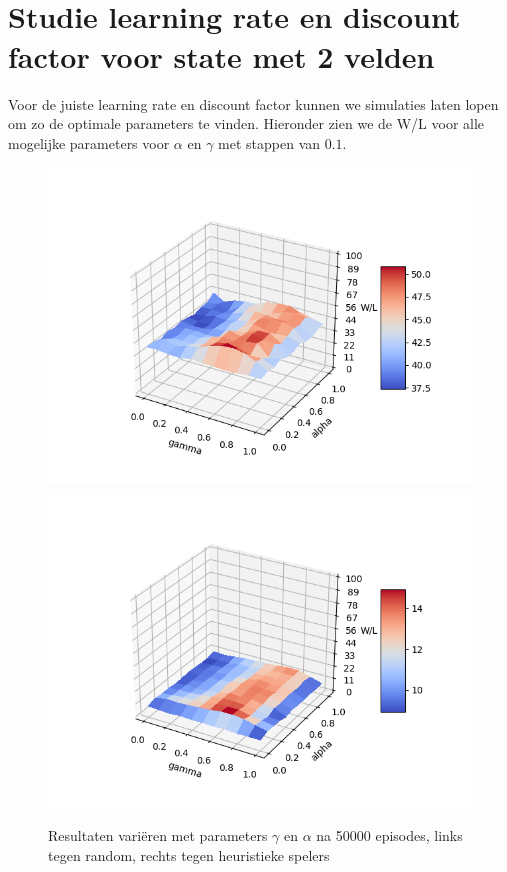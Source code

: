 \documentclass[11pt]{article}
\begin{document}
\section{\\Studie learning rate en discount factor voor state met 2 velden}
\label{appendix:parameters}
Voor de juiste learning rate en discount factor kunnen we simulaties laten lopen om zo de optimale parameters te vinden. Hieronder zien we de W/L voor alle mogelijke parameters voor $\alpha$ en $\gamma$ met stappen van $0.1$.
\begin{figure}[h]
\centering
\includegraphics[scale=0.50]{images/qtable_parameter_random.png}
\includegraphics[scale=0.50]{images/qtable_parameter_heuristic.png}
\caption{Resultaten variëren met parameters $\gamma$ en $\alpha$ na 50000 episodes, links tegen random, rechts tegen heuristieke spelers}
\end{figure}
\end{document}
